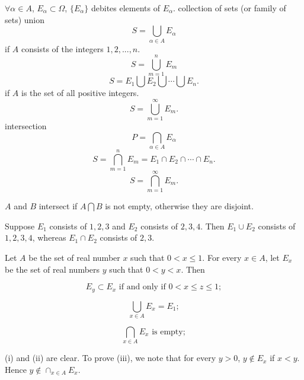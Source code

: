 \begin{mydef}
    \label{mydef:2.9}
    $\forall \alpha\in A$, $E_\alpha \subset \Omega$, $\{E_\alpha\}$ debites elements of $E_\alpha$. 
    collection of sets (or family of sets)  
    union
    \begin{equation}
        \label{eq:2.1}
        S = \bigcup_{\alpha\in A} E_\alpha
    \end{equation}
    if $A$ consists of the integers $1,2,...,n$.
    \begin{equation}
        \label{eq:2.2}
        S = \bigcup_{m=1}^n E_m
    \end{equation}
    \begin{equation}
        \label{eq:2.3}
        S = E_1 \bigcup E_2 \bigcup \cdots \bigcup E_n.
    \end{equation}
    if $A$ is the set of all positive integers.
    \begin{equation}
        \label{eq:2.4}
        S = \bigcup_{m=1}^{\infty} E_m.
    \end{equation}
    intersection
    \begin{equation}
        \label{eq:2.5}
        P = \bigcap_{\alpha\in A} E_\alpha
    \end{equation}
    \begin{equation}
        \label{eq:2.6}
        S = \bigcap_{m=1}^n E_m = E_1 \cap E_2 \cap \cdots \cap E_n.
    \end{equation}
    \begin{equation}
        \label{eq:2.7}
        S = \bigcap_{m=1}^{\infty} E_m.
    \end{equation}

    $A$ and $B$ intersect if $A\bigcap B$ is not empty, otherwise they are disjoint.
\end{mydef}

\begin{myExample}
    \begin{asparaenum}[(a)]
        \item Suppose $E_1$ consists of $1,2,3$ and 
        $E_2$ consists of $2,3,4$.
        Then $E_1 \cup E_2$ consists of $1,2,3,4$,
        whereas $E_1 \cap E_2$ consists of $2,3$.
        \item Let $A$ be the set of real number $x$ such that $0< x\leq 1$. 
        For every $x \in A$, let $E_x$ be the set of real numbers $y$ such that $0 < y < x$. Then 
        \begin{asparaenum}[(i)]
            \item \[E_y \subset E_x \text{ if and only if } 0 < x \leq z \leq 1;\] 
            \item \[\bigcup_{x\in A}E_x = E_1;\]
            \item \[\bigcap_{x\in A}E_x \text{ is empty};\]
        \end{asparaenum}
        (i) and (ii) are clear.
        To prove (iii), we note that for every $y>0$, $y \not\in E_x$ if $x < y$. 
        Hence $y \not\in \cap_{x\in A}E_x$.
    \end{asparaenum}
\end{myExample}

